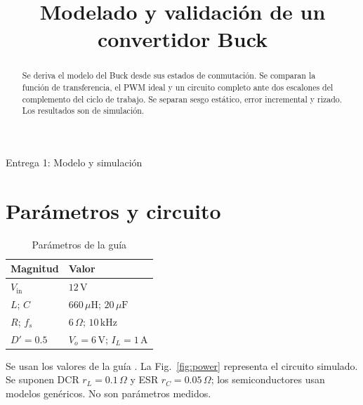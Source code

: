 \documentclass[conference,letterpaper]{IEEEtran}
\begin{document}
\title{Modelado y validación de un convertidor Buck}\author{
}
\maketitle
\begin{center}\small Entrega 1: Modelo y simulación\end{center}
\begin{abstract}Se deriva el modelo del Buck desde sus estados de conmutación. Se comparan la función de transferencia, el PWM ideal y un circuito completo ante dos escalones del complemento del ciclo de trabajo. Se separan sesgo estático, error incremental y rizado. Los resultados son de simulación.\end{abstract}
\section{Parámetros y circuito}
\begin{table}[H]\caption{Parámetros de la guía}\label{tab:nominal}\centering\footnotesize\setlength{\tabcolsep}{2pt}\renewcommand{\arraystretch}{1.18}\begin{tabularx}{\columnwidth}{LY}\toprule
Magnitud & Valor\\\midrule
$V_{\mathrm{in}}$ & $12\,\mathrm{V}$\\
$L$; $C$ & $660\,\mu\mathrm{H}$; $20\,\mu\mathrm{F}$\\
$R$; $f_s$ & $6\,\Omega$; $10\,\mathrm{kHz}$\\
$D'=0.5$ & $V_o=6\,\mathrm{V}$; $I_L=1\,\mathrm{A}$\\\bottomrule\end{tabularx}\end{table}
Se usan los valores de la guía \cite{guide}. La Fig.~\ref{fig:power} representa el circuito simulado. Se suponen DCR $r_L=0.1\,\Omega$ y ESR $r_C=0.05\,\Omega$; los semiconductores usan modelos genéricos. No son parámetros medidos.
\end{document}
